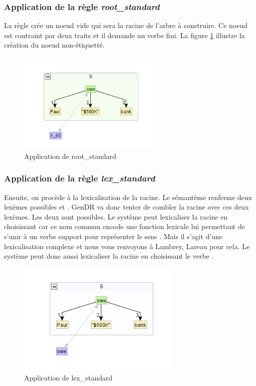 \subsubsection{Application de la règle \emph{root\_standard}}
La règle crée un noeud vide qui sera la racine de l'arbre à construire. Ce noeud est contraint par deux traits et il demande un verbe fini. La figure \ref{fig:rootstand} illustre la création du noeud non-étiquetté.
\begin{figure}[htb]
	\centering
	\includegraphics[width=0.6\textwidth, trim = {0cm 0cm 0cm 0cm},clip]{ch3/figs/inspecteur_root.png}
	\vspace{-0.5cm}
	\caption{Application de root\_standard}
	\label{fig:rootstand}
\end{figure}

\subsubsection{Application de la règle \emph{lex\_standard}}
Ensuite, on procède à la lexicalisation de la racine. Le sémantème  renferme deux lexèmes possibles  et . GenDR va donc tenter de combler la racine avec ces deux lexèmes. Les deux sont possibles. Le système peut lexicaliser la racine en choisissant  car ce nom commun encode une fonction lexicale lui permettant de s'unir à un verbe support pour représenter le sens . Mais il s'agit d'une lexicalisation complexe et nous vous renvoyons à Lambrey, Lareau pour cela. Le système peut donc aussi lexicaliser la racine en choisissant le verbe .

\begin{figure}[htb]
	\centering
	\includegraphics[width=0.7\textwidth, trim = {0cm 0cm 0cm 0cm},clip]{ch3/figs/lex_standard_root.png}
		\vspace{-0.5cm}
	\caption{Application de lex\_standard}
	\label{fig:lexstand1}
\end{figure}

